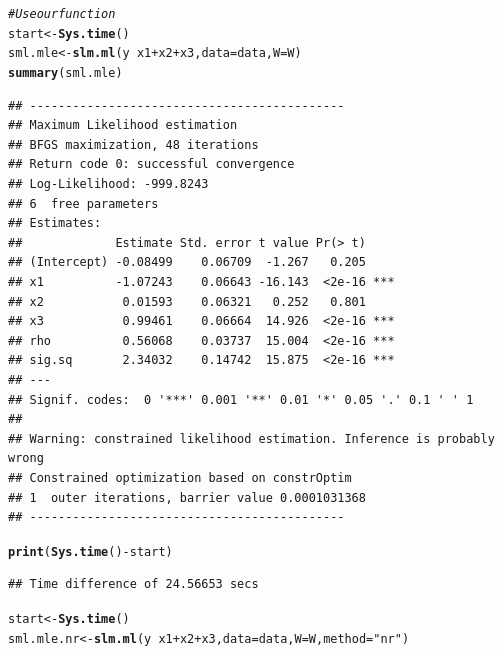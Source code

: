 \documentclass[english,12pt]{book}\usepackage[]{graphicx}\usepackage[]{xcolor}
\makeatletter
\newcommand{\hlsng}[1]{\textcolor[rgb]{0.192,0.494,0.8}{#1}}%
\newcommand{\hlcom}[1]{\textcolor[rgb]{0.678,0.584,0.686}{\textit{#1}}}%
\newcommand{\hlopt}[1]{\textcolor[rgb]{0,0,0}{#1}}%
\newcommand{\hldef}[1]{\textcolor[rgb]{0.345,0.345,0.345}{#1}}%
\newcommand{\hlkwb}[1]{\textcolor[rgb]{0.69,0.353,0.396}{#1}}%
\newcommand{\hlkwc}[1]{\textcolor[rgb]{0.333,0.667,0.333}{#1}}%
\newcommand{\hlkwd}[1]{\textcolor[rgb]{0.737,0.353,0.396}{\textbf{#1}}}%
\newenvironment{kframe}{%
 \def\at@end@of@kframe{}%
 \ifinner\ifhmode%
  \def\at@end@of@kframe{\end{minipage}}%
  \begin{minipage}{\columnwidth}%
 \fi\fi%
 \def\FrameCommand##1{\hskip\@totalleftmargin \hskip-\fboxsep
 \colorbox{shadecolor}{##1}\hskip-\fboxsep
     \hskip-\linewidth \hskip-\@totalleftmargin \hskip\columnwidth}%
 \MakeFramed {\advance\hsize-\width
   \@totalleftmargin\z@ \linewidth\hsize
   \@setminipage}}%
 {\par\unskip\endMakeFramed%
 \at@end@of@kframe}
\newenvironment{knitrout}{}{} %
\let\hlstd\hldef
\let\hlstr\hlsng
\makeatother
\begin{document}
\begin{knitrout}
\color{fgcolor}\begin{kframe}
\begin{alltt}
\hlcom{# Use our function }
\hlstd{start} \hlkwb{<-} \hlkwd{Sys.time}\hlstd{()}
\hlstd{sml.mle} \hlkwb{<-} \hlkwd{slm.ml}\hlstd{(y} \hlopt{~} \hlstd{x1} \hlopt{+} \hlstd{x2} \hlopt{+}  \hlstd{x3,} \hlkwc{data} \hlstd{= data,} \hlkwc{W} \hlstd{= W)}
\hlkwd{summary}\hlstd{(sml.mle)}
\end{alltt}
\begin{verbatim}
## --------------------------------------------
## Maximum Likelihood estimation
## BFGS maximization, 48 iterations
## Return code 0: successful convergence 
## Log-Likelihood: -999.8243 
## 6  free parameters
## Estimates:
##             Estimate Std. error t value Pr(> t)    
## (Intercept) -0.08499    0.06709  -1.267   0.205    
## x1          -1.07243    0.06643 -16.143  <2e-16 ***
## x2           0.01593    0.06321   0.252   0.801    
## x3           0.99461    0.06664  14.926  <2e-16 ***
## rho          0.56068    0.03737  15.004  <2e-16 ***
## sig.sq       2.34032    0.14742  15.875  <2e-16 ***
## ---
## Signif. codes:  0 '***' 0.001 '**' 0.01 '*' 0.05 '.' 0.1 ' ' 1
## 
## Warning: constrained likelihood estimation. Inference is probably wrong
## Constrained optimization based on constrOptim 
## 1  outer iterations, barrier value 0.0001031368 
## --------------------------------------------
\end{verbatim}
\begin{alltt}
\hlkwd{print}\hlstd{(}\hlkwd{Sys.time}\hlstd{()}\hlopt{-} \hlstd{start)}
\end{alltt}
\begin{verbatim}
## Time difference of 24.56653 secs
\end{verbatim}
\begin{alltt}
\hlstd{start} \hlkwb{<-} \hlkwd{Sys.time}\hlstd{()}
\hlstd{sml.mle.nr} \hlkwb{<-} \hlkwd{slm.ml}\hlstd{(y} \hlopt{~} \hlstd{x1} \hlopt{+} \hlstd{x2} \hlopt{+}  \hlstd{x3,} \hlkwc{data} \hlstd{= data,} \hlkwc{W} \hlstd{= W,} \hlkwc{method} \hlstd{=} \hlstr{"nr"}\hlstd{)}
\end{alltt}



\end{kframe}
\end{knitrout}
\end{document}
